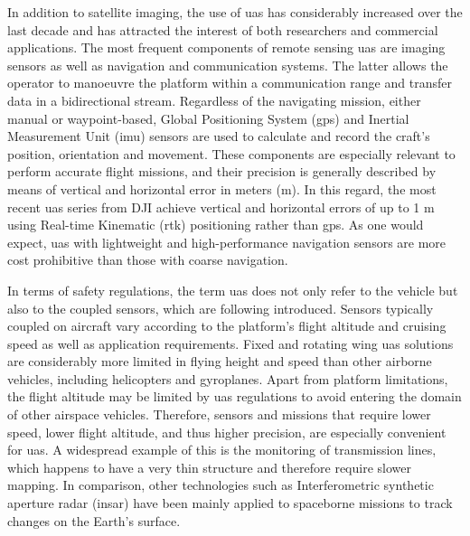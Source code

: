In addition to satellite imaging, the use of \acrshort{uas} has considerably increased over the last decade and has attracted the interest of both researchers and commercial applications. The most frequent components of remote sensing \acrshort{uas} are imaging sensors as well as navigation and communication systems. The latter allows the operator to manoeuvre the platform within a communication range and transfer data in a bidirectional stream. Regardless of the navigating mission, either manual or waypoint-based, Global Positioning System (\acrshort{gps}) and Inertial Measurement Unit (\acrshort{imu}) sensors are used to calculate and record the craft's position, orientation and movement. These components are especially relevant to perform accurate flight missions, and their precision is generally described by means of vertical and horizontal error in meters (\si{\meter}). In this regard, the most recent \acrshort{uas} series from DJI achieve vertical and horizontal errors of up to 1 \si{\meter} using Real-time Kinematic (\acrshort{rtk}) positioning rather than \acrshort{gps}. As one would expect, \acrshort{uas} with lightweight and high-performance navigation sensors are more cost prohibitive than those with coarse navigation.    

In terms of safety regulations, the term \acrshort{uas} does not only refer to the vehicle but also to the coupled sensors, which are following introduced. Sensors typically coupled on aircraft vary according to the platform's flight altitude and cruising speed as well as application requirements. Fixed and rotating wing \acrshort{uas} solutions are considerably more limited in flying height and speed than other airborne vehicles, including helicopters and gyroplanes. Apart from platform limitations, the flight altitude may be limited by \acrshort{uas} regulations to avoid entering the domain of other airspace vehicles. Therefore, sensors and missions that require lower speed, lower flight altitude, and thus higher precision, are especially convenient for \acrshort{uas}. A widespread example of this is the monitoring of transmission lines, which happens to have a very thin structure and therefore require slower mapping. In comparison, other technologies such as Interferometric synthetic aperture radar (\acrshort{insar}) have been mainly applied to spaceborne missions to track changes on the Earth's surface.

